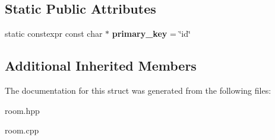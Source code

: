 \subsection*{Static Public Attributes}
\begin{DoxyCompactItemize}
\item 
\mbox{\label{structmods_1_1orm_1_1room_a1f89ba3892f35647303f993db4e1adf0}} 
static constexpr const char $\ast$ {\bfseries primary\+\_\+key} = \char`\"{}id\char`\"{}
\end{DoxyCompactItemize}
\subsection*{Additional Inherited Members}


The documentation for this struct was generated from the following files\+:\begin{DoxyCompactItemize}
\item 
room.\+hpp\item 
room.\+cpp\end{DoxyCompactItemize}
